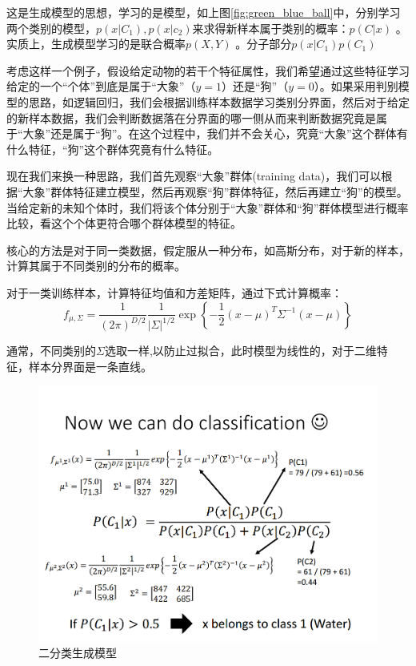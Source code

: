 这是生成模型的思想，学习的是模型，如上图\ref{fig:green_blue_ball}中，分别学习两个类别的模型，$p(x|C_1),p(x|c_2)$来求得新样本属于类别的概率：$p(C|x)$ 。实质上，生成模型学习的是联合概率$p(X,Y)$ 。分子部分$p(x|C_1)p(C_1)$

考虑这样一个例子，假设给定动物的若干个特征属性，我们希望通过这些特征学习给定的一个“个体”到底是属于“大象”（$y=1$）还是“狗”（$y=0$）。如果采用判别模型的思路，如逻辑回归，我们会根据训练样本数据学习类别分界面，然后对于给定的新样本数据，我们会判断数据落在分界面的哪一侧从而来判断数据究竟是属于“大象”还是属于“狗”。在这个过程中，我们并不会关心，究竟“大象”这个群体有什么特征，“狗”这个群体究竟有什么特征。

现在我们来换一种思路，我们首先观察“大象”群体(training data)，我们可以根据“大象”群体特征建立模型，然后再观察“狗”群体特征，然后再建立“狗”的模型。当给定新的未知个体时，我们将该个体分别于“大象”群体和“狗”群体模型进行概率比较，看这个个体更符合哪个群体模型的特征。

核心的方法是对于同一类数据，假定服从一种分布，如高斯分布，对于新的样本，计算其属于不同类别的分布的概率。

对于一类训练样本，计算特征均值和方差矩阵，通过下式计算概率：
$$f_{\mu,\Sigma}=\frac{1}{(2\pi)^{D/2}} \frac{1}{|\Sigma|^{1/2}} \exp \left\{-\frac{1}{2} (x-\mu)^T \Sigma^{-1} (x-\mu)\right\}$$

通常，不同类别的$\Sigma$选取一样,以防止过拟合，此时模型为线性的，对于二维特征，样本分界面是一条直线。
\begin{figure}[ht]
	\centering
	\includegraphics[scale=0.4]{pic/generative_model}
	\caption{二分类生成模型}
	\label{fig:gen_model}
\end{figure}

